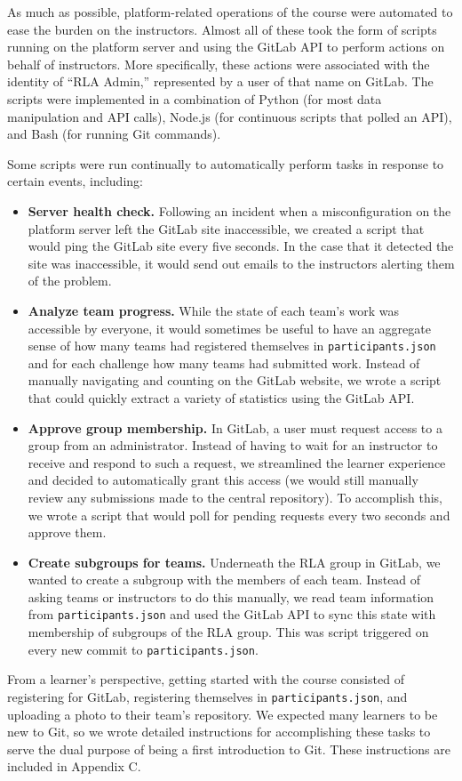 \documentclass[12pt,twoside]{mitthesis}
\newcommand{\review}[1]{{\color{mygreen} #1}}
\begin{document}
\review{As much as possible, platform-related operations of the course were automated to ease the burden on the instructors. Almost all of these took the form of scripts running on the platform server and using the GitLab API to perform actions on behalf of instructors. More specifically, these actions were associated with the identity of ``RLA Admin,'' represented by a user of that name on GitLab. The scripts were implemented in a combination of Python (for most data manipulation and API calls), Node.js (for continuous scripts that polled an API), and Bash (for running Git commands).

Some scripts were run continually to automatically perform tasks in response to certain events, including:
\begin{itemize}
\item \textbf{Server health check.} Following an incident when a misconfiguration on the platform server left the GitLab site inaccessible, we created a script that would ping the GitLab site every five seconds. In the case that it detected the site was inaccessible, it would send out emails to the instructors alerting them of the problem.
\item \textbf{Analyze team progress.} While the state of each team's work was accessible by everyone, it would sometimes be useful to have an aggregate sense of how many teams had registered themselves in \texttt{participants.json} and for each challenge how many teams had submitted work. Instead of manually navigating and counting on the GitLab website, we wrote a script that could quickly extract a variety of statistics using the GitLab API.
\item \textbf{Approve group membership.} In GitLab, a user must request access to a group from an administrator. Instead of having to wait for an instructor to receive and respond to such a request, we streamlined the learner experience and decided to automatically grant this access (we would still manually review any submissions made to the central repository). To accomplish this, we wrote a script that would poll for pending requests every two seconds and approve them. 
\item \textbf{Create subgroups for teams.} Underneath the RLA group in GitLab, we wanted to create a subgroup with the members of each team. Instead of asking teams or instructors to do this manually, we read team information from \texttt{participants.json} and used the GitLab API to sync this state with membership of subgroups of the RLA group. This was script triggered on every new commit to \texttt{participants.json}.
\end{itemize}
From a learner's perspective, getting started with the course consisted of registering for GitLab, registering themselves in \texttt{participants.json}, and uploading a photo to their team's repository. We expected many learners to be new to Git, so we wrote detailed instructions for accomplishing these tasks to serve the dual purpose of being a first introduction to Git. These instructions are included in Appendix C.

}
\end{document}
